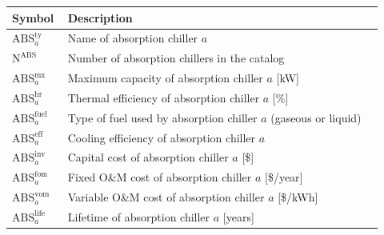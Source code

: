 \documentclass[11pt]{article}
\begin{document}
\begin{center}
\centering
\begin{tabular}{p{0.12\linewidth}p{0.8\linewidth}}
\hline
\textbf{Symbol} & \textbf{Description} \\
\hline
\(\text{ABS}^\text{ty}_a\) & Name of absorption chiller \(a\) \\
\(\text{N}^\text{ABS}\) & Number of absorption chillers in the catalog \\
\(\text{ABS}^\text{mx}_a\) & Maximum capacity of absorption chiller \(a\) [kW] \\
\(\text{ABS}^\text{hr}_a\) & Thermal efficiency of absorption chiller \(a\) [\%] \\
\(\text{ABS}^\text{fuel}_a\) & Type of fuel used by absorption chiller \(a\) (gaseous or liquid) \\
\(\text{ABS}^\text{eff}_a\) & Cooling efficiency of absorption chiller \(a\) \\
\(\text{ABS}^\text{inv}_a\) & Capital cost of absorption chiller \(a\) [\$] \\
\(\text{ABS}^\text{fom}_a\) & Fixed O\&M cost of absorption chiller \(a\) [\$/year] \\
\(\text{ABS}^\text{vom}_a\) & Variable O\&M cost of absorption chiller \(a\) [\$/kWh] \\
\(\text{ABS}^\text{life}_a\) & Lifetime of absorption chiller \(a\) [years] \\
\hline
\end{tabular}
\captionsetup{type=table}
\label{tab:abs_parameters}
\end{center}
\end{document}
